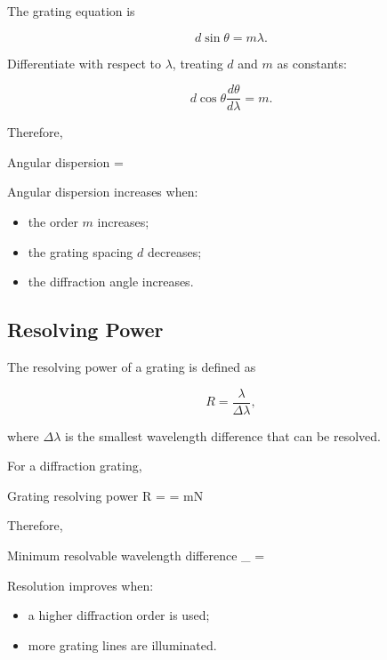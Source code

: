 \documentclass{studentnotes}
\begin{document}
The grating equation is

\[
    d\sin\theta=m\lambda.
\]

Differentiate with respect to \(\lambda\), treating \(d\) and \(m\) as constants:

\[
    d\cos\theta\frac{d\theta}{d\lambda}=m.
\]

Therefore,

\begin{namedformula}{Angular dispersion}
    =
\end{namedformula}

Angular dispersion increases when:

\begin{itemize}
    \item the order \(m\) increases;
    \item the grating spacing \(d\) decreases;
    \item the diffraction angle increases.
\end{itemize}

\subsection{Resolving Power}

The resolving power of a grating is defined as

\[
    R
    =
    \frac{\lambda}{\Delta\lambda},
\]

where \(\Delta\lambda\) is the smallest wavelength difference that can be resolved.

For a diffraction grating,

\begin{namedformula}{Grating resolving power}
    R
    =
    \frac{\lambda}{\Delta\lambda}
    =
    mN
\end{namedformula}

Therefore,

\begin{namedformula}{Minimum resolvable wavelength difference}
    \Delta\lambda_{\min}
    =
\end{namedformula}

Resolution improves when:

\begin{itemize}
    \item a higher diffraction order is used;
    \item more grating lines are illuminated.
\end{itemize}
\end{document}
